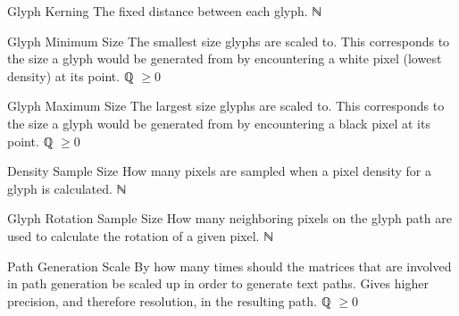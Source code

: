 \begin{itemize}
{\begin{itemize}
      \paritem
      {Glyph Kerning}
      {The fixed distance between each glyph.}
      {ℕ}
      {\GlyphKrnParSymbol}

      \paritem
      {Glyph Minimum Size}
      {The smallest size glyphs are scaled to.
        This corresponds to the size a glyph would be generated from by encountering a white pixel (lowest density) at its point.}
      {ℚ \(\geq 0\)}
      {\GlyphSzMinParSymbol}

      \paritem
      {Glyph Maximum Size}
      {The largest size glyphs are scaled to.
        This corresponds to the size a glyph would be generated from by encountering a black pixel at its point.
      }
      {ℚ \(\geq 0\)}
      {\GlyphSzMaxParSymbol}

      \paritem
      {Density Sample Size}
      {How many pixels are sampled when a pixel density for a glyph is calculated.}
      {ℕ}
      {\DnsSampleParSymbol}

      \paritem
      {Glyph Rotation Sample Size}
      {How many neighboring pixels on the glyph path are used to calculate the rotation of a given pixel.}
      {ℕ}
      {\GlyphRotParSymbol}

      \paritem
      {Path Generation Scale}
      {By how many times should the matrices that are involved in path generation be scaled up in order to generate text paths.
        Gives higher precision, and therefore resolution, in the resulting path.}
      {ℚ \(\geq 0\)}
      {\PathGenSclParSymbol}

    \end{itemize}
  }
\end{itemize}